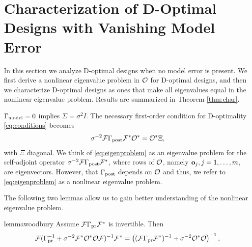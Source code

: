 \section{Characterization of D-Optimal Designs with Vanishing Model Error}\label{section:vanishing}
In this section we analyze D-optimal designs when no model error is
present. We first derive a nonlinear eigenvalue problem in $\mathcal{O}$ for
D-optimal designs, and then we characterize D-optimal designs as ones
that make all eigenvalues equal in the nonlinear eigenvalue
problem. Results are summarized in Theorem \ref{thm:char}.


$\Gamma_{\textup{model}} = 0$ implies $\Sigma= \sigma^2I$. The necessary first-order
condition for D-optimality \eqref{eq:conditions} becomes
\begin{equation}\label{eq:eigenproblem}
  \sigma^{-2}\fwd \postcov \fwd^* \obs^* = \obs^* \Xi,
\end{equation}
with $\Xi$ diagonal. We think of \eqref{eq:eigenproblem} as an
eigenvalue problem for the self-adjoint operator $\sigma^{-2}\mathcal{F}
\Gamma_{\textup{post}} \mathcal{F}^*$, where rows of $\mathcal{O}$, namely $\mathbf{o}_j,j=1,\dots, m$,
are eigenvectors. However, that $\Gamma_{\textup{post}}$ depends on $\mathcal{O}$ and thus,
we refer to \eqref{eq:eigenproblem} as a nonlinear eigenvalue problem.

The following two lemmas allow us to gain better understanding of the
nonlinear eigenvalue problem.

\begin{restatable*}{lemma}{woodbury}\label{lemma:twice woodbury}
  Assume $\mathcal{F} \Gamma_{\textup{pr}} \mathcal{F}^*$ is invertible. Then
  \begin{align*}
    \begin{split}
      \fwd( \prcov^{-1} + \sigma^{-2}  \fwd^* \obs^* \obs \fwd )^{-1} \fwd^* 
      = \left ( (\fwd\prcov\fwd^*)^{-1} + \sigma^{-2}  \obs^* \obs \right )^{-1},
    \end{split}
  \end{align*}  
\end{restatable*}


